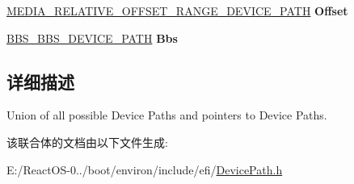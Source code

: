 \begin{DoxyCompactItemize}
\item 
\mbox{\label{union_e_f_i___d_e_v___p_a_t_h_a1581af1af49777081d2f1b6b5995a129}} 
\hyperlink{struct_m_e_d_i_a___r_e_l_a_t_i_v_e___o_f_f_s_e_t___r_a_n_g_e___d_e_v_i_c_e___p_a_t_h}{M\+E\+D\+I\+A\+\_\+\+R\+E\+L\+A\+T\+I\+V\+E\+\_\+\+O\+F\+F\+S\+E\+T\+\_\+\+R\+A\+N\+G\+E\+\_\+\+D\+E\+V\+I\+C\+E\+\_\+\+P\+A\+TH} {\bfseries Offset}
\item 
\mbox{\label{union_e_f_i___d_e_v___p_a_t_h_a98213f0f4e2651da0e54fd4cb6842c40}} 
\hyperlink{struct_b_b_s___b_b_s___d_e_v_i_c_e___p_a_t_h}{B\+B\+S\+\_\+\+B\+B\+S\+\_\+\+D\+E\+V\+I\+C\+E\+\_\+\+P\+A\+TH} {\bfseries Bbs}
\end{DoxyCompactItemize}


\subsection{详细描述}
Union of all possible Device Paths and pointers to Device Paths. 

该联合体的文档由以下文件生成\+:\begin{DoxyCompactItemize}
\item 
E\+:/\+React\+O\+S-\/0../boot/environ/include/efi/\hyperlink{_device_path_8h}{Device\+Path.\+h}\end{DoxyCompactItemize}
